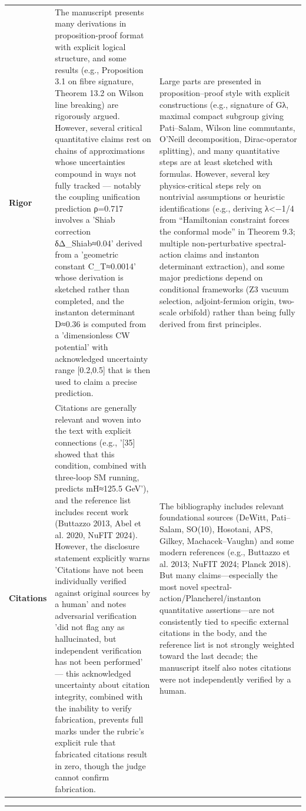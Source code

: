\documentclass[11pt]{article}
\begin{document}
\begin{longtable}{@{} p{2.2cm} p{6.3cm} p{6.3cm} @{}}
\rowcolor{rowgray}
\textbf{Rigor} &
The manuscript presents many derivations in proposition-proof format with explicit logical structure, and some results (e.g., Proposition 3.1 on fibre signature, Theorem 13.2 on Wilson line breaking) are rigorously argued. However, several critical quantitative claims rest on chains of approximations whose uncertainties compound in ways not fully tracked — notably the coupling unification prediction ρ=0.717 involves a 'Shiab correction δΔ\_Shiab≈0.04' derived from a 'geometric constant C\_T≈0.0014' whose derivation is sketched rather than completed, and the instanton determinant D≈0.36 is computed from a 'dimensionless CW potential' with acknowledged uncertainty range [0.2,0.5] that is then used to claim a precise prediction. &
Large parts are presented in proposition–proof style with explicit constructions (e.g., signature of Gλ, maximal compact subgroup giving Pati–Salam, Wilson line commutants, O’Neill decomposition, Dirac-operator splitting), and many quantitative steps are at least sketched with formulas. However, several key physics-critical steps rely on nontrivial assumptions or heuristic identifications (e.g., deriving λ<−1/4 from “Hamiltonian constraint forces the conformal mode” in Theorem 9.3; multiple non-perturbative spectral-action claims and instanton determinant extraction), and some major predictions depend on conditional frameworks (Z3 vacuum selection, adjoint-fermion origin, two-scale orbifold) rather than being fully derived from first principles. \\[6pt]

\textbf{Citations} &
Citations are generally relevant and woven into the text with explicit connections (e.g., '[35] showed that this condition, combined with three-loop SM running, predicts mH≈125.5 GeV'), and the reference list includes recent work (Buttazzo 2013, Abel et al. 2020, NuFIT 2024). However, the disclosure statement explicitly warns 'Citations have not been individually verified against original sources by a human' and notes adversarial verification 'did not flag any as hallucinated, but independent verification has not been performed' — this acknowledged uncertainty about citation integrity, combined with the inability to verify fabrication, prevents full marks under the rubric's explicit rule that fabricated citations result in zero, though the judge cannot confirm fabrication. &
The bibliography includes relevant foundational sources (DeWitt, Pati–Salam, SO(10), Hosotani, APS, Gilkey, Machacek–Vaughn) and some modern references (e.g., Buttazzo et al. 2013; NuFIT 2024; Planck 2018). But many claims—especially the most novel spectral-action/Plancherel/instanton quantitative assertions—are not consistently tied to specific external citations in the body, and the reference list is not strongly weighted toward the last decade; the manuscript itself also notes citations were not independently verified by a human. \\

\end{longtable}

\bigskip
\hrule
\bigskip
\end{document}
